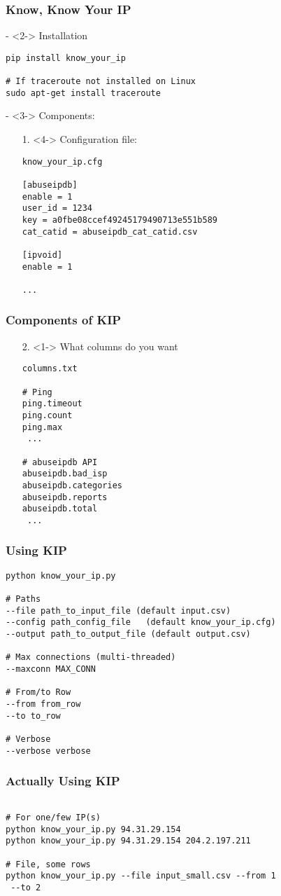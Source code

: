 \documentclass[compress]{beamer}
\begin{document}
\begin{frame}[fragile]
\frametitle{Know, Know Your IP}
\begin{large_enum}
\item[-]<2-> Installation\\\normalsize
\begin{verbatim}
pip install know_your_ip

# If traceroute not installed on Linux
sudo apt-get install traceroute 
\end{verbatim}
\item[-]<3-> Components:

\begin{itemize}
\item[1. ]<4-> Configuration file: \\
\begin{verbatim}
know_your_ip.cfg

[abuseipdb]
enable = 1
user_id = 1234
key = a0fbe08ccef49245179490713e551b589
cat_catid = abuseipdb_cat_catid.csv

[ipvoid]
enable = 1

...
\end{verbatim}
\end{itemize}
\end{large_enum}
\end{frame}

\begin{frame}[fragile]
\frametitle{Components of KIP}
\begin{large_enum}
\item[]<1->
\begin{itemize}
\item[2. ]<1-> What columns do you want
\begin{verbatim}
columns.txt

# Ping
ping.timeout
ping.count
ping.max
 ...

# abuseipdb API
abuseipdb.bad_isp
abuseipdb.categories
abuseipdb.reports
abuseipdb.total
 ...
\end{verbatim}
\end{itemize}
\end{large_enum}
\end{frame}

\begin{frame}[fragile]
\frametitle{Using KIP}
\begin{verbatim}
python know_your_ip.py  

# Paths
--file path_to_input_file (default input.csv)
--config path_config_file   (default know_your_ip.cfg)
--output path_to_output_file (default output.csv)

# Max connections (multi-threaded)
--maxconn MAX_CONN

# From/to Row
--from from_row
--to to_row

# Verbose
--verbose verbose

\end{verbatim}
\end{frame}

\begin{frame}[fragile]
\frametitle{Actually Using KIP}
\begin{verbatim}

# For one/few IP(s)
python know_your_ip.py 94.31.29.154 
python know_your_ip.py 94.31.29.154 204.2.197.211

# File, some rows
python know_your_ip.py --file input_small.csv --from 1
 --to 2

\end{verbatim}
\end{frame}
\end{document}
